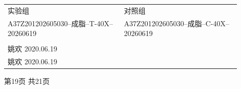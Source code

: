 \documentclass[UTF8,10pt,a4paper,fontset=fandol]{ctexart}
\newcommand{\fieldvalue}[1]{#1}
\newcommand{\handwritten}[1]{#1}
\begin{document}
\begin{tabular}{|p{0.45\linewidth}|p{0.45\linewidth}|}
\hline
实验组 &
对照组
\\[-2pt]
\fieldvalue{A37Z201202605030--成脂--T-40X--20260619}
&
\fieldvalue{A37Z201202605030--成脂--C-40X--20260619}
\\
\hline
\begin{minipage}[t]{0.42\linewidth}
\centering
\fbox{\rule{0pt}{0.22\linewidth}\rule{0.9\linewidth}{0pt}}
\\[-2pt]
\fieldvalue{\handwritten{姚欢}}
\quad
\fieldvalue{\handwritten{2020.06.19}}
\end{minipage}
&
\begin{minipage}[t]{0.42\linewidth}
\centering
\fbox{\rule{0pt}{0.22\linewidth}\rule{0.9\linewidth}{0pt}}
\\[-2pt]
\fieldvalue{\handwritten{姚欢}}
\quad
\fieldvalue{\handwritten{2020.06.19}}
\end{minipage}
\\
\hline
\end{tabular}

\begin{center}
第19页 共21页
\end{center}

\newpage
\end{document}
